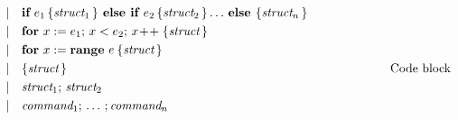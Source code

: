 \begin{fleqn}
\begin{align*}
                 & \hspace{-0.1cm}                  &    & | \ \ \ \textbf{if} \ e_1 \, \{ \textit{struct}_1 \, \} \textbf{ else if } e_2 \, \{ \textit{struct}_2 \, \} \ldots \, \textbf{else } \{ \textit{struct}_n \, \} &  &                                    \\
                 & \hspace{-0.1cm}                  &    & | \ \ \ \textbf{for} \ x := e_1; \, x < e_2; \, x \! + \! + \; \{ \textit{struct} \, \}                                                                          &  &                                    \\
                 & \hspace{-0.1cm}                  &    & | \ \ \ \textbf{for} \ x := \textbf{range} \ e \: \{ \textit{struct} \,  \}                                                                                      &  &                                    \\
                 & \hspace{-0.1cm}                  &    & | \ \ \ \{ \textit{struct} \, \}                                                                                                                                 &  & \hspace*{2cm}\text{Code block}     \\
                 & \hspace{-0.1cm}                  &    & | \ \ \ \textit{struct}_1; \, \textit{struct}_2                                                                                                                  &  &                                    \\
                 & \hspace{-0.1cm}                  &    & | \ \ \ \textit{command}_1; \, \ldots \, ; \textit{command}_n                                                                                                    &  &                                    \\
        \end{align*}


\end{fleqn}
